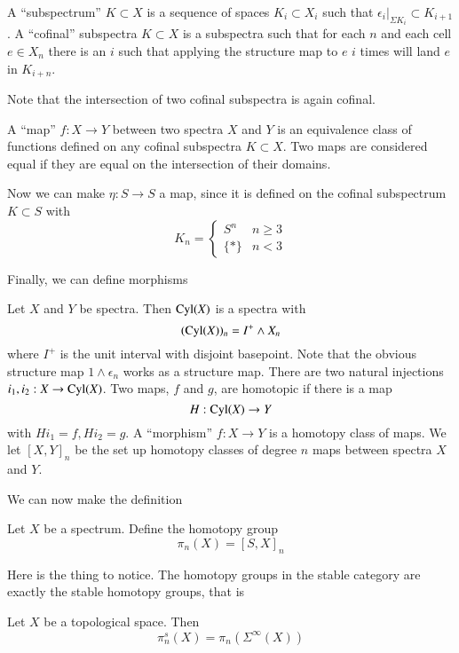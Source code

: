 \begin{Def}
  A ``subspectrum'' $K\subset X$ is a sequence of spaces $K_i\subset X_i$ such that $\epsilon_i|_{\Sigma K_i}\subset K_{i+1}$.
  A ``cofinal'' subspectra $K\subset X$ is a subspectra such that for each $n$ and each cell 
  $e\in X_n$ there is an $i$ such that applying the structure map to $e$ $i$ times will land $e$ in $K_{i+n}$.  
\end{Def}

Note that the intersection of two cofinal subspectra is again cofinal.  

\begin{Def}
  A ``map'' $f:X\to Y$ between two spectra $X$ and $Y$ is an equivalence class of functions defined on any cofinal subspectra $K\subset X$.  
  Two maps are considered equal if they are equal on the intersection of their domains.  
\end{Def}

Now we can make $\eta:S\to S$ a map, since it is defined on the cofinal subspectrum $K\subset S$ with
\[K_n = \left\{\begin{array}{cc} 
S^n & n \ge 3\\
\{*\} & n < 3
\end{array}\right.\]

Finally, we can define morphisms
\begin{Def}
  Let $X$ and $Y$ be spectra.  Then $\operatorname{Cyl}\nolimits(X)$ is a spectra with 
  \[(\operatorname{Cyl}\nolimits(X))_n=I^+\wedge X_n\]
  where $I^+$ is the unit interval with disjoint basepoint.  
  Note that the obvious structure map $1\wedge \epsilon_n$ works as a structure map.  
  There are two natural injections $i_1,i_2: X\to \operatorname{Cyl}\nolimits(X)$.  
  Two maps, $f$ and $g$, are homotopic if there is a map 
  \[H:\operatorname{Cyl}\nolimits(X)\to Y\]
  with $Hi_1=f, Hi_2=g$.  
  A ``morphism'' $f:X\to Y$ is a homotopy class of maps.  
  We let $[X,Y]_n$ be the set up homotopy classes of degree $n$ maps between spectra $X$ and $Y$.  
\end{Def}

We can now make the definition
\begin{Def}
  Let $X$ be a spectrum.  Define the homotopy group
  \[\pi_n(X)=[S,X]_n\]
\end{Def}
Here is the thing to notice.  
The homotopy groups in the stable category are exactly the stable homotopy groups, that is
\begin{Theorem}
  Let $X$ be a topological space.  Then
  \[\pi_n^s(X)=\pi_n(\Sigma^\infty(X))\]
\end{Theorem}

